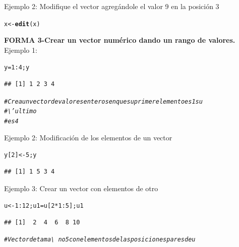 \documentclass[12pt,letterpaper]{article}\usepackage[]{graphicx}\usepackage[]{color}
\makeatletter
\newcommand{\hlnum}[1]{\textcolor[rgb]{0.686,0.059,0.569}{#1}}%
\newcommand{\hlcom}[1]{\textcolor[rgb]{0.678,0.584,0.686}{\textit{#1}}}%
\newcommand{\hlopt}[1]{\textcolor[rgb]{0,0,0}{#1}}%
\newcommand{\hlstd}[1]{\textcolor[rgb]{0.345,0.345,0.345}{#1}}%
\newcommand{\hlkwb}[1]{\textcolor[rgb]{0.69,0.353,0.396}{#1}}%
\newcommand{\hlkwd}[1]{\textcolor[rgb]{0.737,0.353,0.396}{\textbf{#1}}}%
\newenvironment{kframe}{%
 \def\at@end@of@kframe{}%
 \ifinner\ifhmode%
  \def\at@end@of@kframe{\end{minipage}}%
  \begin{minipage}{\columnwidth}%
 \fi\fi%
 \def\FrameCommand##1{\hskip\@totalleftmargin \hskip-\fboxsep
 \colorbox{shadecolor}{##1}\hskip-\fboxsep
     \hskip-\linewidth \hskip-\@totalleftmargin \hskip\columnwidth}%
 \MakeFramed {\advance\hsize-\width
   \@totalleftmargin\z@ \linewidth\hsize
   \@setminipage}}%
 {\par\unskip\endMakeFramed%
 \at@end@of@kframe}
\newenvironment{knitrout}{}{} %
\makeatother
\begin{document}
Ejemplo 2: Modifique el vector agreg\'andole el valor 9 en la posici\'on 3
\begin{knitrout}
\color{fgcolor}\begin{kframe}
\begin{alltt}
\hlstd{x} \hlkwb{<-} \hlkwd{edit}\hlstd{(x)}
\end{alltt}
\end{kframe}
\end{knitrout}

\textbf{FORMA 3-Crear un vector num\'erico dando un rango de valores.}\\

Ejemplo 1: 
\begin{knitrout}
\color{fgcolor}\begin{kframe}
\begin{alltt}
\hlstd{y} \hlkwb{=} \hlnum{1}\hlopt{:}\hlnum{4}\hlstd{; y}
\end{alltt}
\begin{verbatim}
## [1] 1 2 3 4
\end{verbatim}
\begin{alltt}
\hlcom{# Crea un vector de valores enteros en que su primer elemento es 1 su}
\hlcom{# \textbackslash{}'ultimo}
\hlcom{#es 4}
\end{alltt}
\end{kframe}
\end{knitrout}

Ejemplo 2: Modificaci\'on de los elementos de un vector
\begin{knitrout}
\color{fgcolor}\begin{kframe}
\begin{alltt}
\hlstd{y[}\hlnum{2}\hlstd{]} \hlkwb{<-} \hlnum{5}\hlstd{;y}
\end{alltt}
\begin{verbatim}
## [1] 1 5 3 4
\end{verbatim}
\end{kframe}
\end{knitrout}

Ejemplo 3: Crear un vector con elementos de otro
\begin{knitrout}
\color{fgcolor}\begin{kframe}
\begin{alltt}
\hlstd{u} \hlkwb{<-} \hlnum{1}\hlopt{:}\hlnum{12}\hlstd{; u1}\hlkwb{=}\hlstd{u[}\hlnum{2} \hlopt{*} \hlnum{1}\hlopt{:}\hlnum{5}\hlstd{];u1}
\end{alltt}
\begin{verbatim}
## [1]  2  4  6  8 10
\end{verbatim}
\begin{alltt}
\hlcom{# Vector de tama\textbackslash{}~no 5 con elementos de las posiciones pares de u}
\end{alltt}
\end{kframe}
\end{knitrout}
\end{document}
